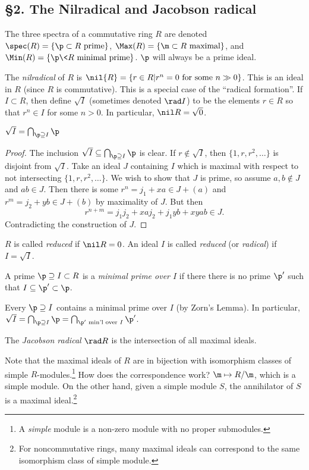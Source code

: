   \subsection{\S 2. The Nilradical and Jacobson radical}

 The three spectra of a commutative ring $R$ are denoted $\spec(R) = \{\p\subset R \text{
 prime}\}$, $\Max(R) = \{\m\subset R\text{ maximal}\}$, and $\Min(R) = \{\p\< R \text{ minimal
 prime}\}$. $\p$ will always be a prime ideal.

 The \emph{nilradical} of $R$ is $\nil{R}=\{r\in R| r^n=0 \text{ for some }n\gg 0\}$.
 This is an ideal in $R$ (since $R$ is commutative). This is a special case of the
 ``radical formation''. If $I\subset R$, then define $\sqrt{I}$ (sometimes denoted $\rad I$)
 to be the elements $r\in R$ so that $r^n\in I$ for some $n>0$.  In particular, $\nil R =
 \sqrt 0$.

 \begin{lemma}
   $\sqrt{I} = \bigcap_{\p \supseteq I}\p$
 \end{lemma}
 \begin{proof}
   The inclusion $\sqrt I \subseteq \bigcap_{\p \supseteq I}\p$ is clear. If $r\not\in
   \sqrt{I}$, then $\{1,r,r^2,\dots\}$ is disjoint from $\sqrt I$. Take an ideal $J$
   containing $I$ which is maximal with respect to not intersecting $\{1,r,r^2,\dots\}$.
   We wish to show that $J$ is prime, so assume $a,b\not\in J$ and $ab\in J$. Then there
   is some $r^n= j_1 + xa \in J+(a)$ and $r^m = j_2+yb\in J+(b)$ by maximality of $J$.
   But then
   \[
    r^{n+m} = j_1j_2 + xaj_2 + j_1yb + xyab \in J.
   \]
   Contradicting the construction of $J$.
 \end{proof}
 \begin{definition}
   $R$ is called \emph{reduced} if $\nil R=0$. An ideal $I$ is called \emph{reduced} (or
   \emph{radical}) if $I=\sqrt I$.
 \end{definition}

 \begin{definition}
   A prime $\p\supseteq I\subset R$ is a \emph{minimal prime over $I$} if there there is no
   prime $\p'$ such that $I\subseteq \p'\subset \p$.
 \end{definition}
 Every $\p\supseteq I$ contains a minimal prime over $I$ (by Zorn's Lemma). In
 particular, $\sqrt I = \bigcap_{\p\supseteq I}\p = \bigcap_{\p'\text{ min'l over } I}
 \p'$.

 \begin{definition}
   The \emph{Jacobson radical} $\rad R$ is the intersection of all maximal ideals.
 \end{definition}
 Note that the maximal ideals of $R$ are in bijection with isomorphism classes of simple
 $R$-modules.\footnote{A \emph{simple} module is a non-zero module with no proper
 submodules.} How does the correspondence work? $\m\mapsto R/\m$, which is a simple
 module. On the other hand, given a simple module $S$, the annihilator of $S$ is a
 maximal ideal.\footnote{For noncommutative rings, many maximal ideals can correspond to
 the same isomorphism class of simple module.}

